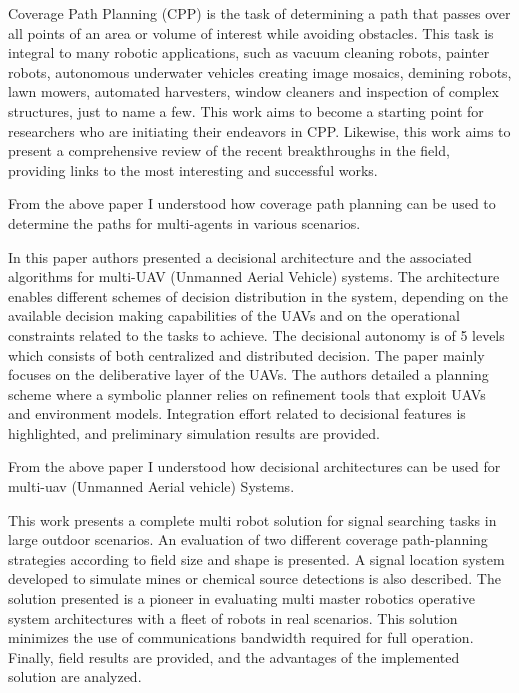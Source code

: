\documentclass[conference]{IEEEtran}
\begin{document}
Coverage Path Planning (CPP) is the task of determining a path that passes over all points of an area or volume of interest while avoiding obstacles. This task is integral to many robotic applications, such as vacuum cleaning robots, painter robots, autonomous underwater vehicles creating image mosaics, demining robots, lawn mowers, automated harvesters, window cleaners and inspection of complex structures, just to name a few. This work aims to become a starting point for researchers who are initiating their endeavors in CPP. Likewise, this work aims to present a comprehensive review of the recent breakthroughs in the field, providing links to the most interesting and successful works\cite{galceran2013survey}.
 
From the above paper I understood how coverage path planning can be used to determine the paths for multi-agents in various scenarios.

In this paper authors presented a decisional architecture and the associated algorithms for multi-UAV (Unmanned Aerial Vehicle) systems. The architecture enables different schemes of decision distribution in the system, depending on the available decision making capabilities of the UAVs and on the operational constraints related to the tasks to achieve. The decisional autonomy is of 5 levels which consists of both centralized and distributed decision. The paper mainly focuses on the deliberative layer of the UAVs. The authors detailed a planning scheme where a symbolic planner relies on refinement tools that exploit UAVs and environment models. Integration effort related to decisional features is highlighted, and preliminary simulation results are provided\cite{gancet2005task}.

From the above paper I understood how decisional architectures can be used for multi-uav (Unmanned Aerial vehicle) Systems.

This work presents a complete multi robot solution for signal searching tasks in large outdoor scenarios. An evaluation of two different coverage path-planning strategies according to field size and shape is presented. A signal location system developed to simulate mines or chemical source detections is also described. The solution presented is a pioneer in evaluating multi master robotics operative system architectures with a fleet of robots in real scenarios. This solution minimizes the use of communications bandwidth required for full operation. Finally, field results are provided, and the advantages of the implemented solution are analyzed\cite{garzon2016multirobot}.
\end{document}
